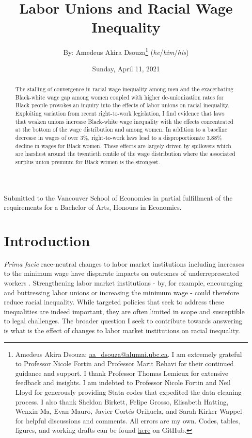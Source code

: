 \documentclass[11pt]{article}
\title{Labor Unions and Racial Wage Inequality}
\author{By: Amedeus Akira Dsouza\thanks{Amedeus Akira Dsouza: \href{mailto:aa_dsouza@alumni.ubc.ca}{aa\_dsouza@alumni.ubc.ca}. I am extremely grateful to Professor Nicole Fortin and Professor Marit Rehavi for their continued guidance and support. I thank Professor Thomas Lemieux for extensive feedback and insights. I am indebted to Professor Nicole Fortin and Neil Lloyd for generously providing Stata codes that expedited the data cleaning process. I also thank Sheldon Birkett, Felipe Grosso, Elisabeth Hatting, Wenxin Ma, Evan Mauro, Javier Cort\'{e}s Orihuela, and Sarah Kirker Wappel for helpful discussions and comments. All errors are my own. Codes, tables, figures, and working drafts can be found \href{https://github.com/aadsouza/econ499}{here} on GitHub.} \textsc{ (}\textit{he}\textsc{/}\textit{him}\textsc{/}\textit{his}\textsc{)}}
\affil{University of British Columbia}
\affil{Supervised by: Nicole Fortin and M. Marit Rehavi}
\date{Sunday, April 11, 2021}
\begin{document}
\begin{titlepage}
\maketitle
\thispagestyle{empty}
\centering
\vspace{2cm}
Submitted to the Vancouver School of Economics in partial fulfillment of the requirements for a Bachelor of Arts, Honours in Economics.
\end{titlepage}
\doublespacing
\thispagestyle{empty}
\begin{abstract}
The stalling of convergence in racial wage inequality among men and the exacerbating Black-white wage gap among women coupled with higher de-unionization rates for Black people provokes an inquiry into the effects of labor unions on racial inequality. Exploiting variation from recent right-to-work legislation, I find evidence that laws that weaken unions increase Black-white wage inequality with the effects concentrated at the bottom of the wage distribution and among women. In addition to a baseline decrease in wages of over 3\%, right-to-work laws lead to a disproportionate 3.88\% decline in wages for Black women. These effects are largely driven by spillovers which are harshest around the twentieth centile of the wage distribution where the associated surplus union premium for Black women is the strongest.
\end{abstract}
\clearpage
{}
\section{Introduction}\label{sec:intro}
\textit{Prima facie} race-neutral changes to labor market institutions including increases to the minimum wage have disparate impacts on outcomes of underrepresented workers \citep[see, for example,][]{derenoncourtmontialoux2020}. Strengthening labor market institutions - by, for example, encouraging and buttressing labor unions or increasing the minimum wage - could therefore reduce racial inequality. While targeted policies that seek to address these inequalities are indeed important, they are often limited in scope and susceptible to legal challenges. The broader question I seek to contribute towards answering is what is the effect of changes to labor market institutions on racial inequality. 
\end{document}
